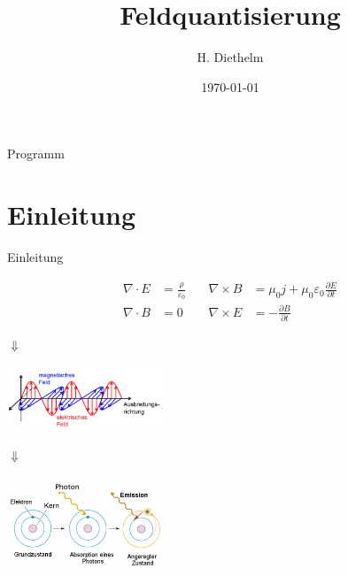 \documentclass{beamer}
\author{H. Diethelm}
\title{Feldquantisierung}
\date{\today}
\begin{document}
\begin{frame}[t,plain]
\titlepage
\end{frame}

\begin{frame}{Programm}
\tableofcontents
\end{frame}


\section{Einleitung}
\begin{frame}[t]{Einleitung}
	\vspace*{-0.5cm}
	\begin{center}
			\begin{minipage}{0.35\textwidth}
				\begin{align*}
				\nabla\cdot E &= \frac{\rho}{\varepsilon_0} & \quad
				\nabla\times B &= \mu_0 j  + \mu_0 \varepsilon_0\frac{\partial E}{\partial t}\\
				\nabla\cdot B &=0 & \quad
				\nabla\times E &= -\frac{\partial B }{\partial t}
				\end{align*}
			\end{minipage}
			
			$\Downarrow$
			
			\includegraphics[width=0.35\textwidth]{emwelle.png}

			$\Downarrow$

			\includegraphics[width=0.35\textwidth]{anregung.png}
	\end{center}

\end{frame}

\end{document}

